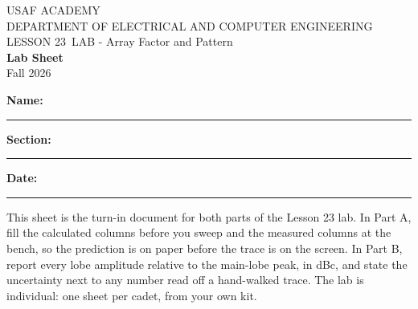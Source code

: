 \documentclass{exam}
\def\labLesson{23}
\def\thisterm{\thisTermIn}
\def\thisterm{Fall 2026}
\begin{document}
\pagestyle{headandfoot}   %



\begin{center}
USAF ACADEMY \\
DEPARTMENT OF ELECTRICAL AND COMPUTER ENGINEERING \\
LESSON \labLesson\ LAB - Array Factor and Pattern \\
\textbf{Lab Sheet} \\
\thisterm \\[4mm]
\end{center}

\vspace{-4pt}
\textbf{Name:} \rule[-2pt]{2.6in}{0.4pt} \hfill
\textbf{Section:} \rule[-2pt]{0.9in}{0.4pt} \hfill
\textbf{Date:} \rule[-2pt]{1.1in}{0.4pt}

\vspace{4pt}

This sheet is the turn-in document for both parts of the Lesson 23 lab. In
Part A, fill the calculated columns before you sweep and the measured columns
at the bench, so the prediction is on paper before the trace is on the screen.
In Part B, report every lobe amplitude relative to the main-lobe peak, in dBc,
and state the uncertainty next to any number read off a hand-walked trace. The
lab is individual: one sheet per cadet, from your own kit.

\end{document}
